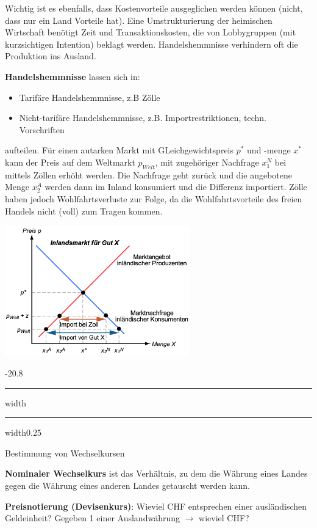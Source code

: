 \documentclass[9pt, landscape, fleqn]{scrartcl}
\makeatletter
\renewcommand{\subsection}{\@startsection{subsection}{1}{0mm}%
{-2\baselineskip}{0.8\baselineskip}%
{\hrule depth 0.2pt width\columnwidth\hrule depth0.75pt
width0.25\columnwidth\vspace*{1.2em}\large\bfseries\rmfamily}}
\makeatother
\begin{document}
\begin{multicols*}{3}
Wichtig ist es ebenfalls, dass Kostenvorteile ausgeglichen werden können (nicht, dass nur ein Land Vorteile hat). Eine Umstrukturierung der heimischen Wirtschaft benötigt Zeit und Transaktionskosten, die von Lobbygruppen (mit kurzsichtigen Intention) beklagt werden. Handelshemmnisse verhindern oft die Produktion ins Ausland. \newline 

\textbf{Handelshemmnisse} lassen sich in:

\begin{itemize}
    \item Tarifäre Handelshemmnisse, z.B Zölle 
    \item Nicht-tarifäre Handelshemmnisse, z.B. Importrestriktionen, techn. Vorschriften
\end{itemize}

aufteilen. Für einen autarken Markt mit GLeichgewichtspreis $p^*$ und -menge $x^*$ kann der Preis auf dem Weltmarkt $p_{Welt}$, mit zugehöriger Nachfrage $x_1^N$ bei mittels Zöllen erhöht werden. Die Nachfrage geht zurück und die angebotene Menge $x_2^A$ werden dann im Inland konsumiert und die Differenz importiert. Zölle haben jedoch Wohlfahrtsverluste zur Folge, da die Wohlfahrtsvorteile des freien Handels nicht (voll) zum Tragen kommen.


\begin{center}
    \includegraphics[width=8cm]{Importzoll.png}
\end{center}

\subsection{Bestimmung von Wechselkursen}

\textbf{Nominaler Wechselkurs} ist das Verhältnis, zu dem die Währung eines Landes gegen die Währung eines anderen Landes getauscht werden kann. \newline 

\textbf{Preisnotierung (Devisenkurs)}: Wieviel CHF entsprechen einer ausländischen Geldeinheit? Gegeben 1 einer Auslandwährung $\rightarrow$ wieviel CHF?\newline 


\end{multicols*}
\end{document}
